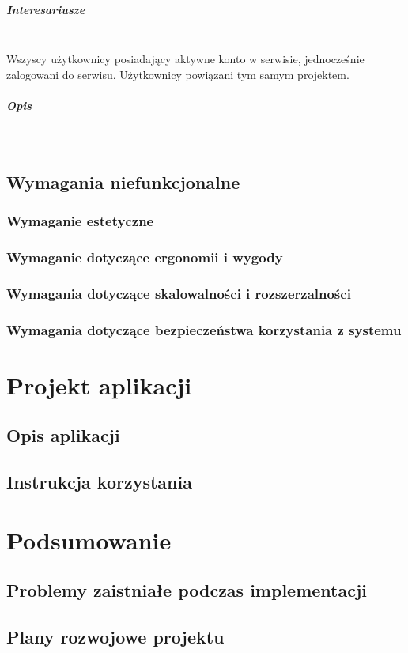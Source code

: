 \documentclass[eng,printmode]{mgr}
\begin{document}
\paragraph{Interesariusze}\ \\
Wszyscy użytkownicy posiadający aktywne konto w serwisie, jednocześnie zalogowani do serwisu. Użytkownicy powiązani tym samym projektem.

\paragraph{Opis}\ \\
\newpage

\section{Wymagania niefunkcjonalne}
\subsection{Wymaganie estetyczne}
\subsection{Wymaganie dotyczące ergonomii i wygody}
\subsection{Wymagania dotyczące skalowalności i rozszerzalności}
\subsection{Wymagania dotyczące bezpieczeństwa korzystania z systemu}
\chapter{Projekt aplikacji}
\section{Opis aplikacji}
\section{Instrukcja korzystania}
\chapter{Podsumowanie}
\section{Problemy zaistniałe podczas implementacji}
\section{Plany rozwojowe projektu}

\end{document}
